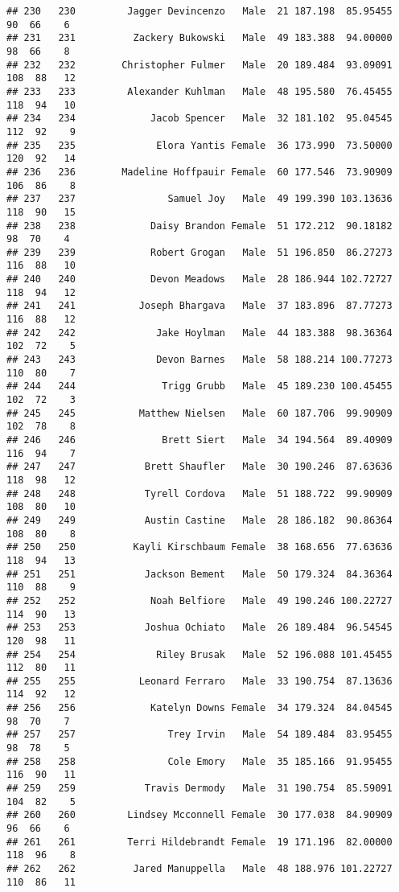 \documentclass[
]{article}
\begin{document}
\begin{verbatim}
## 230   230         Jagger Devincenzo   Male  21 187.198  85.95455  90  66    6
## 231   231          Zackery Bukowski   Male  49 183.388  94.00000  98  66    8
## 232   232        Christopher Fulmer   Male  20 189.484  93.09091 108  88   12
## 233   233         Alexander Kuhlman   Male  48 195.580  76.45455 118  94   10
## 234   234             Jacob Spencer   Male  32 181.102  95.04545 112  92    9
## 235   235              Elora Yantis Female  36 173.990  73.50000 120  92   14
## 236   236        Madeline Hoffpauir Female  60 177.546  73.90909 106  86    8
## 237   237                Samuel Joy   Male  49 199.390 103.13636 118  90   15
## 238   238             Daisy Brandon Female  51 172.212  90.18182  98  70    4
## 239   239             Robert Grogan   Male  51 196.850  86.27273 116  88   10
## 240   240             Devon Meadows   Male  28 186.944 102.72727 118  94   12
## 241   241           Joseph Bhargava   Male  37 183.896  87.77273 116  88   12
## 242   242              Jake Hoylman   Male  44 183.388  98.36364 102  72    5
## 243   243              Devon Barnes   Male  58 188.214 100.77273 110  80    7
## 244   244               Trigg Grubb   Male  45 189.230 100.45455 102  72    3
## 245   245           Matthew Nielsen   Male  60 187.706  99.90909 102  78    8
## 246   246               Brett Siert   Male  34 194.564  89.40909 116  94    7
## 247   247            Brett Shaufler   Male  30 190.246  87.63636 118  98   12
## 248   248            Tyrell Cordova   Male  51 188.722  99.90909 108  80   10
## 249   249            Austin Castine   Male  28 186.182  90.86364 108  80    8
## 250   250          Kayli Kirschbaum Female  38 168.656  77.63636 118  94   13
## 251   251            Jackson Bement   Male  50 179.324  84.36364 110  88    9
## 252   252             Noah Belfiore   Male  49 190.246 100.22727 114  90   13
## 253   253            Joshua Ochiato   Male  26 189.484  96.54545 120  98   11
## 254   254              Riley Brusak   Male  52 196.088 101.45455 112  80   11
## 255   255           Leonard Ferraro   Male  33 190.754  87.13636 114  92   12
## 256   256             Katelyn Downs Female  34 179.324  84.04545  98  70    7
## 257   257                Trey Irvin   Male  54 189.484  83.95455  98  78    5
## 258   258                Cole Emory   Male  35 185.166  91.95455 116  90   11
## 259   259            Travis Dermody   Male  31 190.754  85.59091 104  82    5
## 260   260         Lindsey Mcconnell Female  30 177.038  84.90909  96  66    6
## 261   261         Terri Hildebrandt Female  19 171.196  82.00000 118  96    8
## 262   262          Jared Manuppella   Male  48 188.976 101.22727 110  86   11

\end{verbatim}
\end{document}
